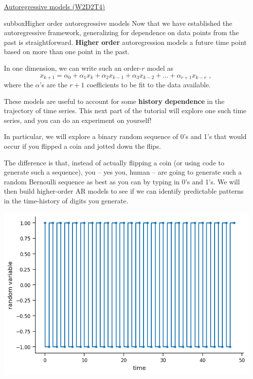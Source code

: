 \begin{textbox}{\href{https://compneuro.neuromatch.io/tutorials/W2D2_LinearSystems/student/W2D2_Tutorial4.html}{Autoregressive models (W2D2T4)} }
\begin{subbox}{subbox}{Higher order autoregressive models}
\scriptsize
Now that we have established the autoregressive framework, generalizing for dependence on data points from the past is straightforward. \textbf{Higher order} autoregression models a future time point based on more than one point in the past.

In one dimension, we can write such an order-$r$ model as
$$
x_{k+1} = \alpha_0 + \alpha_1 x_k + \alpha_2 x_{k-1} + \alpha_3 x_{k-2} + \dots + \alpha_{r+1} x_{k-r} \text{  , }
$$
where the $\alpha$'s are the $r+1$ coefficients to be fit to the data available.

These models are useful to account for some \textbf{history dependence} in the trajectory of time series. This next part of the tutorial will explore one such time series, and you can do an experiment on yourself!

In particular, we will explore a binary random sequence of 0's and 1's that would occur if you flipped a coin and jotted down the flips. 

The difference is that, instead of actually flipping a coin (or using code to generate such a sequence), you -- yes you, human -- are going to generate such a random Bernoulli sequence as best as you can by typing in 0's and 1's. We will then build higher-order AR models to see if we can identify predictable patterns in the time-history of digits you generate.
\begin{center}
\includegraphics[scale=0.3]{Figures/LS/CDS_Figure11.png}
\end{center}

\end{subbox}

\end{textbox}

